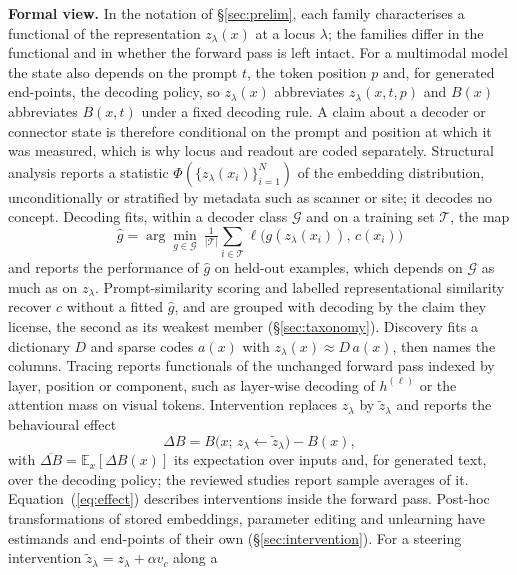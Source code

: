 \textbf{Formal view.} In the notation of \S\ref{sec:prelim}, each family characterises a functional of
the representation $z_\lambda(x)$ at a locus $\lambda$; the families differ in the functional and in
whether the forward pass is left intact. For a multimodal model the state also depends on the prompt
$t$, the token position $p$ and, for generated end-points, the decoding policy, so $z_\lambda(x)$
abbreviates $z_\lambda(x,t,p)$ and $B(x)$ abbreviates $B(x,t)$ under a fixed decoding rule. A claim
about a decoder or connector state is therefore conditional on the prompt and position at which it was
measured, which is why locus and readout are coded separately. Structural analysis reports a statistic
$\Phi(\{z_\lambda(x_i)\}_{i=1}^{N})$ of the embedding distribution, unconditionally or stratified by
metadata such as scanner or site; it decodes no concept. Decoding fits, within a decoder class
$\mathcal{G}$ and on a training set $\mathcal{T}$, the map
\begin{equation}
\hat g=\arg\min_{g\in\mathcal G}\ \tfrac{1}{|\mathcal T|}\textstyle\sum_{i\in\mathcal T}\ell\big(g(z_\lambda(x_i)),\,c(x_i)\big)
\label{eq:probe}
\end{equation}
and reports the performance of $\hat g$ on held-out examples, which depends on $\mathcal G$ as much as
on $z_\lambda$. Prompt-similarity scoring and labelled representational similarity recover $c$ without
a fitted $\hat g$, and are grouped with decoding by the claim they license, the second as its weakest
member (\S\ref{sec:taxonomy}). Discovery fits a dictionary $D$ and sparse codes $a(x)$ with
$z_\lambda(x)\approx D\,a(x)$, then names the columns. Tracing reports functionals of the unchanged
forward pass indexed by layer, position or component, such as layer-wise decoding of $h^{(\ell)}$ or the
attention mass on visual tokens. Intervention replaces $z_\lambda$ by $\tilde z_\lambda$ and reports the
behavioural effect
\begin{equation}
\Delta B=B\big(x;\,z_\lambda\!\leftarrow\!\tilde z_\lambda\big)-B(x),
\label{eq:effect}
\end{equation}
with $\overline{\Delta B}=\mathbb{E}_x[\Delta B(x)]$ its expectation over inputs and, for generated
text, over the decoding policy; the reviewed studies report sample averages of it.
Equation~(\ref{eq:effect}) describes interventions inside the forward pass. Post-hoc transformations of
stored embeddings, parameter editing and unlearning have estimands and end-points of their own
(\S\ref{sec:intervention}). For a steering intervention $\tilde z_\lambda=z_\lambda+\alpha v_c$ along a

